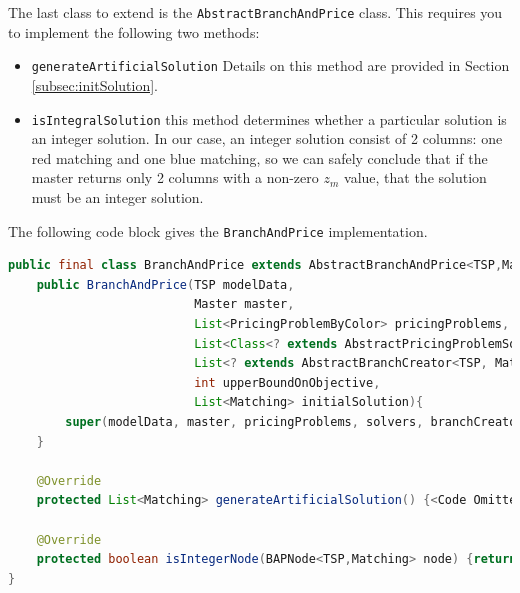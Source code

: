 \documentclass[a4paper]{article}
\newenvironment{myblock}[1]{%
    \tcolorbox[beamer,%
    noparskip,breakable,
    colback=lightBlueCodeBlock,colframe=darkBlueCodeBlock,%
    colbacklower=darkBlueCodeBlock!75!lightBlueCodeBlock,%
    coltitle=blueTitleCodeBlock,
    title=#1]}%
    {\endtcolorbox}
\newcommand{\code}[1]{\lstinline[language=java, style=seminar]!#1!}
\begin{document}
The last class to extend is the \code{AbstractBranchAndPrice} class. This requires you to implement the following two methods:
\begin{itemize}
 \item \code{generateArtificialSolution} Details on this method are provided in Section \ref{subsec:initSolution}.
 \item \code{isIntegralSolution} this method determines whether a particular solution is an integer solution. In our case, an integer solution consist of 2 columns: one red matching and one blue matching, so we can safely conclude that if the master returns only 2 columns with a non-zero $z_m$ value, that the solution must be an integer solution.
\end{itemize}
The following code block gives the \code{BranchAndPrice} implementation.
\begin{myblock}{BranchAndPrice}
\begin{lstlisting}[language=java, style=eclipseArticle, xleftmargin=2em]  
public final class BranchAndPrice extends AbstractBranchAndPrice<TSP,Matching, PricingProblemByColor> {
    public BranchAndPrice(TSP modelData,
                          Master master,
                          List<PricingProblemByColor> pricingProblems,
                          List<Class<? extends AbstractPricingProblemSolver<TSP, Matching, PricingProblemByColor>>> solvers,
                          List<? extends AbstractBranchCreator<TSP, Matching, PricingProblemByColor>> branchCreators,
                          int upperBoundOnObjective,
                          List<Matching> initialSolution){
        super(modelData, master, pricingProblems, solvers, branchCreators, upperBoundOnObjective, initialSolution);
    }

    @Override
    protected List<Matching> generateArtificialSolution() {<Code Omitted>}

    @Override
    protected boolean isIntegerNode(BAPNode<TSP,Matching> node) {return node.getSolution().size()==2;}
}
\end{lstlisting}
\end{myblock}
\end{document}
